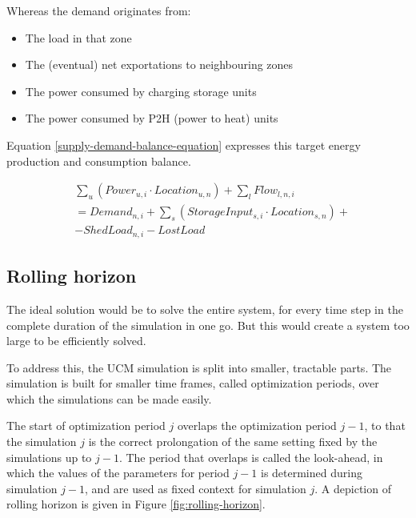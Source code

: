 Whereas the demand originates from:
\begin{itemize}
    \item The load in that zone
    \item The (eventual) net exportations to neighbouring zones
    \item The power consumed by charging storage units
    \item The power consumed by P2H (power to heat) units
\end{itemize}

Equation \ref{supply-demand-balance-equation} expresses this target energy production and consumption balance.

\begin{captionnable}[h]
    \begin{equation}
        \begin{split}
            &\sum_{u} (Power_{u,i} \cdot Location_{u,n}) + \sum_{l} Flow_{l,n,i} \\
            & = Demand_{n,i} + \sum_{s} (StorageInput_{s,i} \cdot Location_{s,n}) + \\
            & - ShedLoad_{n,i} - LostLoad 		
        \end{split}
        \label{supply-demand-balance-equation}
    \end{equation}
\end{captionnable}

\subsection{Rolling horizon}

The ideal solution would be to solve the entire system, for every time step in the complete duration of the simulation in one go. But this would create a system too large to be efficiently solved.

To address this, the UCM simulation is split into smaller, tractable parts. The simulation is built for smaller time frames, called optimization periods, over which the simulations can be made easily.

The start of optimization period $j$ overlaps the optimization period $j-1$, to that the simulation $j$ is the correct prolongation of the same setting fixed by the simulations up to $j-1$. The period that overlaps is called the look-ahead, in which the values of the parameters for period $j-1$ is determined during simulation $j-1$, and are used as fixed context for simulation $j$. A depiction of rolling horizon is given in Figure \ref{fig:rolling-horizon}.

